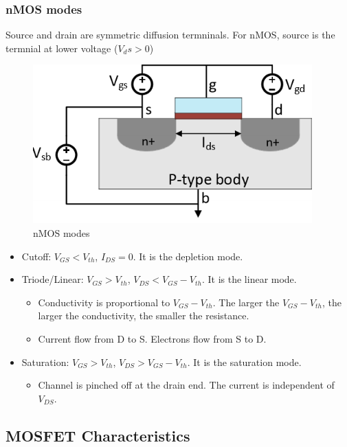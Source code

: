 \subsubsection{nMOS modes}

Source and drain are symmetric diffusion termninals. For nMOS, source is the termnial at lower voltage ($V_ds > 0$) 

\begin{figure}[h]
    \centering
    \includegraphics[scale=0.5]{images/nMOS.png}
    \caption{nMOS modes}
\end{figure}

\begin{itemize}
    \item Cutoff: $V_{GS} < V_{th}$, $I_{DS} = 0$. It is the depletion mode.
    \item Triode/Linear: $V_{GS} > V_{th}$, $V_{DS} < V_{GS} - V_{th}$. It is the linear mode.\begin{itemize}
        \item Conductivity is proportional to $V_{GS} - V_{th}$. The larger the $V_{GS} - V_{th}$, the larger the conductivity, the smaller the resistance.
        \item Current flow from D to S. Electrons flow from S to D.
    \end{itemize}
    \item Saturation: $V_{GS} > V_{th}$, $V_{DS} > V_{GS} - V_{th}$. It is the saturation mode.\begin{itemize}
        \item Channel is pinched off at the drain end. The current is independent of $V_{DS}$.
    \end{itemize}
\end{itemize}

\subsection{MOSFET Characteristics}

